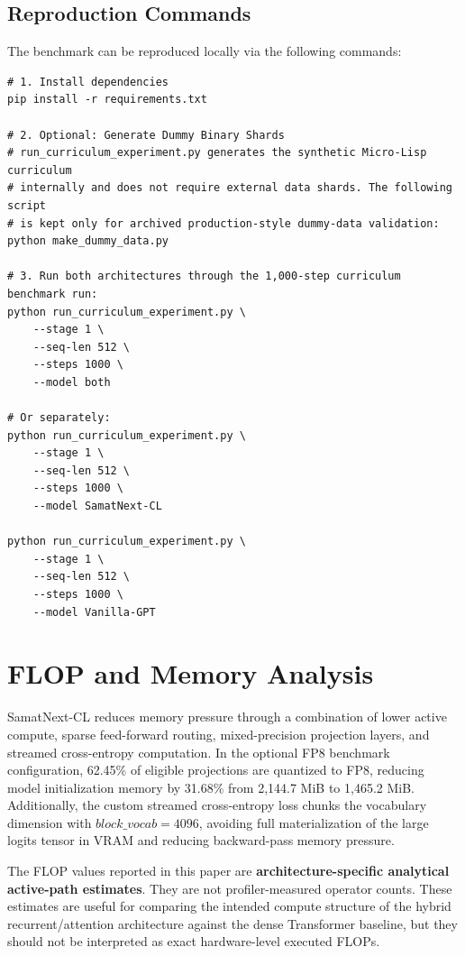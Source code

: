 \documentclass[11pt,a4paper]{article}
\begin{document}
\subsection{Reproduction Commands}
The benchmark can be reproduced locally via the following commands:
\begin{verbatim}
# 1. Install dependencies
pip install -r requirements.txt

# 2. Optional: Generate Dummy Binary Shards
# run_curriculum_experiment.py generates the synthetic Micro-Lisp curriculum
# internally and does not require external data shards. The following script
# is kept only for archived production-style dummy-data validation:
python make_dummy_data.py

# 3. Run both architectures through the 1,000-step curriculum benchmark run:
python run_curriculum_experiment.py \
    --stage 1 \
    --seq-len 512 \
    --steps 1000 \
    --model both

# Or separately:
python run_curriculum_experiment.py \
    --stage 1 \
    --seq-len 512 \
    --steps 1000 \
    --model SamatNext-CL

python run_curriculum_experiment.py \
    --stage 1 \
    --seq-len 512 \
    --steps 1000 \
    --model Vanilla-GPT
\end{verbatim}

\section{FLOP and Memory Analysis}
SamatNext-CL reduces memory pressure through a combination of lower active compute, sparse feed-forward routing, mixed-precision projection layers, and streamed cross-entropy computation. In the optional FP8 benchmark configuration, 62.45\% of eligible projections are quantized to FP8, reducing model initialization memory by 31.68\% from 2,144.7 MiB to 1,465.2 MiB. Additionally, the custom streamed cross-entropy loss chunks the vocabulary dimension with $block\_vocab=4096$, avoiding full materialization of the large logits tensor in VRAM and reducing backward-pass memory pressure.

The FLOP values reported in this paper are \textbf{architecture-specific analytical active-path estimates}. They are not profiler-measured operator counts. These estimates are useful for comparing the intended compute structure of the hybrid recurrent/attention architecture against the dense Transformer baseline, but they should not be interpreted as exact hardware-level executed FLOPs.
\end{document}

